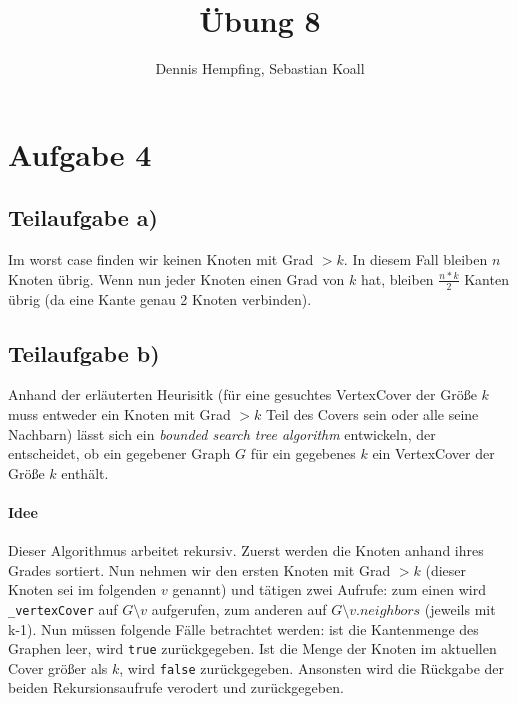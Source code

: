 \documentclass[12pt]{scrartcl}%
\theoremstyle{nonumberplain}
\newcommand{\code}[1]{\lstinline[basicstyle=\ttfamily\color{black}]{#1}}
\begin{document}
\author{Dennis Hempfing, Sebastian Koall}
\title{Übung 8}
\date{} 
\pagestyle{myheadings}

\maketitle %

\section*{Aufgabe 4}

\subsection*{Teilaufgabe a)}

Im worst case finden wir keinen Knoten mit Grad $> k$. In diesem Fall bleiben $n$ Knoten übrig. Wenn nun jeder Knoten einen Grad von $k$ hat, bleiben $\frac{n*k}{2}$ Kanten übrig (da eine Kante genau 2 Knoten verbinden).

\subsection*{Teilaufgabe b)}

Anhand der erläuterten Heurisitk (für eine gesuchtes {\sc VertexCover} der Größe $k$ muss entweder ein Knoten mit Grad $> k$ Teil des Covers sein oder alle seine Nachbarn) lässt sich ein \textit{bounded search tree algorithm} entwickeln, der entscheidet, ob ein gegebener Graph $G$ für ein gegebenes $k$ ein {\sc VertexCover} der Größe $k$ enthält.

\paragraph{Idee} Dieser Algorithmus arbeitet rekursiv. Zuerst werden die Knoten anhand ihres Grades sortiert. Nun nehmen wir den ersten Knoten mit Grad $> k$ (dieser Knoten sei im folgenden $v$ genannt) und tätigen zwei Aufrufe: zum einen wird \code{_vertexCover} auf $G\setminus v$ aufgerufen, zum anderen auf $G\setminus v.neighbors$ (jeweils mit k-1). Nun müssen folgende Fälle betrachtet werden: ist die Kantenmenge des Graphen leer, wird \code{true} zurückgegeben. Ist die Menge der Knoten im aktuellen Cover größer als $k$, wird \code{false} zurückgegeben. Ansonsten wird die Rückgabe der beiden Rekursionsaufrufe verodert und zurückgegeben.\\
\end{document}
